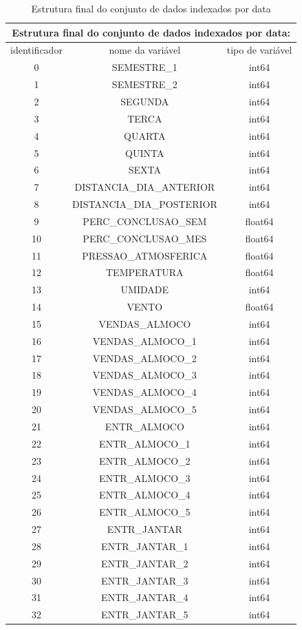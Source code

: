 \documentclass[	12pt, Times, openright, twoside, a4paper, english, brazil]{abntex2}
\begin{document}
       \begin{table}[!ht]
            \centering
           \caption{Estrutura final do conjunto de dados indexados por data} 
        \begin{tabular}{|c|c|c|} \hline
        \multicolumn{3}{c}{ Estrutura final do conjunto de dados indexados por data: } \\
        \hline
        identificador &	nome da variável					&tipo de variável\\ 
        \hline
        0&	SEMESTRE\_1					&int64 \\
        1&	SEMESTRE\_2					&int64\\
        2&	SEGUNDA						&int64 \\
        3&	TERCA						&int64 \\
        4&	QUARTA						&int64 \\ 
        5&	QUINTA						&int64 \\ 
        6&	SEXTA						&int64 \\ 
        7&	DISTANCIA\_DIA\_ANTERIOR	&	int64 \\ 
        8&	DISTANCIA\_DIA\_POSTERIOR	&	int64 \\
        9&	PERC\_CONCLUSAO\_SEM		&	float64 \\
        10&	PERC\_CONCLUSAO\_MES		&	float64 \\
        11&	PRESSAO\_ATMOSFERICA		&	float64 \\
        12&	TEMPERATURA					&float64 \\ 
        13&	UMIDADE						&int64 \\
        14&	VENTO						&float64\\ 
        15&	VENDAS\_ALMOCO				&int64 \\
        16&	VENDAS\_ALMOCO\_1			&	int64 \\ 
        17&	VENDAS\_ALMOCO\_2			&	int64 \\
        18&	VENDAS\_ALMOCO\_3			&	int64\\ 
        19&	VENDAS\_ALMOCO\_4			&	int64 \\
        20&	VENDAS\_ALMOCO\_5			&	int64 \\ 
        21&	ENTR\_ALMOCO				&	int64\\
        22&	ENTR\_ALMOCO\_1				&int64 \\
        23&	ENTR\_ALMOCO\_2				&int64 \\
        24&	ENTR\_ALMOCO\_3				&int64 \\ 
        25&	ENTR\_ALMOCO\_4				&int64 \\
        26&	ENTR\_ALMOCO\_5				&int64 \\
        27&	ENTR\_JANTAR				&	int64 \\ 
        28&	ENTR\_JANTAR\_1				&int64\\
        29&	ENTR\_JANTAR\_2				&int64 \\ 
        30&	ENTR\_JANTAR\_3				&int64 \\ 
        31&	ENTR\_JANTAR\_4				&int64 \\
        32&	ENTR\_JANTAR\_5				&int64\\
              \hline
    \end{tabular} \end{table}
    
\end{document}
